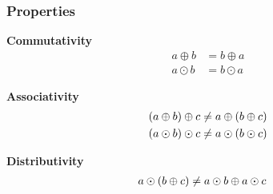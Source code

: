\begin{frame}

\frametitle{Properties}

\vspace{\fill}

\begin{center}

\begin{minipage}{0.5\textwidth}
\begin{center}
\textbf{Commutativity} \begin{align*}
a \oplus b &= b \oplus a \\
a \odot b &= b \odot a
\end{align*}
\end{center}
\end{minipage}%
\begin{minipage}{0.5\textwidth}
\begin{center}
\textbf{Associativity}~\frownie \begin{align*}
 \mathopen{}\left(a \oplus b\right)\mathclose{}  \oplus c &\neq a \oplus  \mathopen{}\left(b \oplus c\right)\mathclose{}  \\
 \mathopen{}\left(a \odot b\right)\mathclose{}  \odot c &\neq a \odot  \mathopen{}\left(b \odot c\right)\mathclose{} 
\end{align*}
\end{center}
\end{minipage}

\vspace{\fill}

\textbf{Distributivity}~\frownie \begin{align*}
a \odot  \mathopen{}\left(b \oplus c\right)\mathclose{}  &\neq a \odot b \oplus a \odot c
\end{align*}

\end{center}

\vspace{\fill}

\end{frame}
